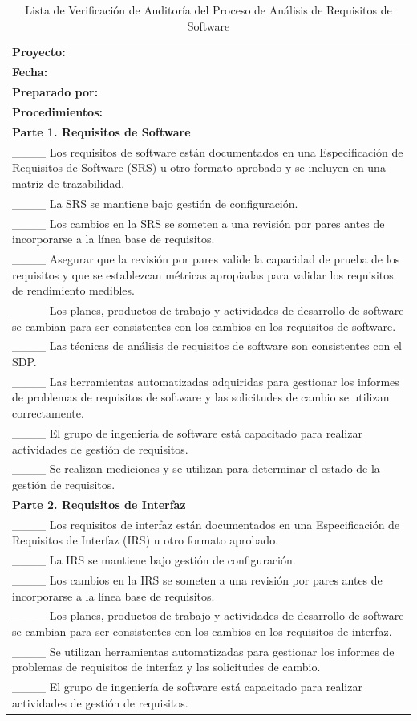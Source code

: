 \begin{table}[H]
\centering
\caption{Lista de Verificación de Auditoría del Proceso de Análisis de Requisitos de Software}
\label{fig:b5}
\begin{tabular}{|p{14cm}|}
\hline
\textbf{Proyecto:} \\
\textbf{Fecha:} \\
\textbf{Preparado por:} \\
\hline
\textbf{Procedimientos:} \\
\textbf{Parte 1. Requisitos de Software} \\
\_\_\_\_ Los requisitos de software están documentados en una Especificación de Requisitos de Software (SRS) u otro formato aprobado y se incluyen en una matriz de trazabilidad. \\
\_\_\_\_ La SRS se mantiene bajo gestión de configuración. \\
\_\_\_\_ Los cambios en la SRS se someten a una revisión por pares antes de incorporarse a la línea base de requisitos. \\
\_\_\_\_ Asegurar que la revisión por pares valide la capacidad de prueba de los requisitos y que se establezcan métricas apropiadas para validar los requisitos de rendimiento medibles. \\
\_\_\_\_ Los planes, productos de trabajo y actividades de desarrollo de software se cambian para ser consistentes con los cambios en los requisitos de software. \\
\_\_\_\_ Las técnicas de análisis de requisitos de software son consistentes con el SDP. \\
\_\_\_\_ Las herramientas automatizadas adquiridas para gestionar los informes de problemas de requisitos de software y las solicitudes de cambio se utilizan correctamente. \\
\_\_\_\_ El grupo de ingeniería de software está capacitado para realizar actividades de gestión de requisitos. \\
\_\_\_\_ Se realizan mediciones y se utilizan para determinar el estado de la gestión de requisitos. \\
\textbf{Parte 2. Requisitos de Interfaz} \\
\_\_\_\_ Los requisitos de interfaz están documentados en una Especificación de Requisitos de Interfaz (IRS) u otro formato aprobado. \\
\_\_\_\_ La IRS se mantiene bajo gestión de configuración. \\
\_\_\_\_ Los cambios en la IRS se someten a una revisión por pares antes de incorporarse a la línea base de requisitos. \\
\_\_\_\_ Los planes, productos de trabajo y actividades de desarrollo de software se cambian para ser consistentes con los cambios en los requisitos de interfaz. \\
\_\_\_\_ Se utilizan herramientas automatizadas para gestionar los informes de problemas de requisitos de interfaz y las solicitudes de cambio. \\
\_\_\_\_ El grupo de ingeniería de software está capacitado para realizar actividades de gestión de requisitos. \\
\hline
\end{tabular}
\end{table}

